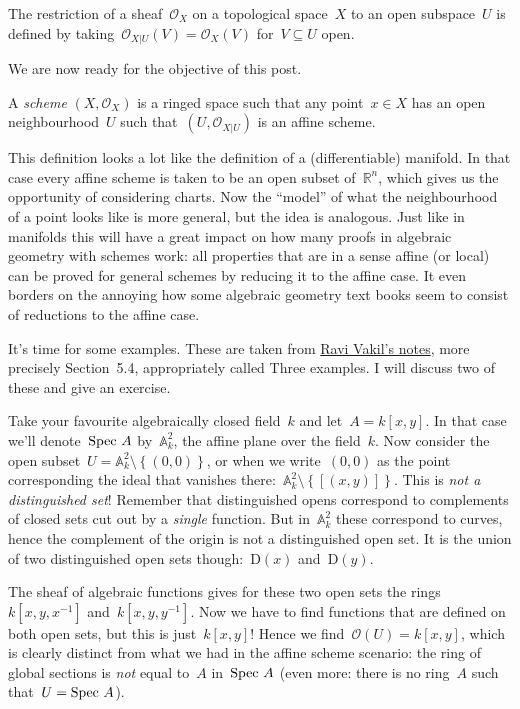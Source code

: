 \begin{definition}
  The restriction of a sheaf~$\mathcal{O}_X$ on a topological space~$X$ to an open subspace~$U$ is defined by taking~$\mathcal{O}_{X|U}(V)=\mathcal{O}_X(V)$ for~$V\subseteq U$ open.
\end{definition}

We are now ready for the objective of this post.

\begin{definition}
  A \emph{scheme} $(X,\mathcal{O}_X)$ is a ringed space such that any point~$x\in X$ has an open neighbourhood~$U$ such that~$(U,\mathcal{O}_{X|U})$ is an affine scheme.
\end{definition}

This definition looks a lot like the definition of a (differentiable) manifold. In that case every affine scheme is taken to be an open subset of~$\mathbb{R}^n$, which gives us the opportunity of considering charts. Now the ``model'' of what the neighbourhood of a point looks like is more general, but the idea is analogous. Just like in manifolds this will have a great impact on how many proofs in algebraic geometry with schemes work: all properties that are in a sense affine (or local) can be proved for general schemes by reducing it to the affine case. It even borders on the annoying how some algebraic geometry text books seem to consist of reductions to the affine case.

It's time for some examples. These are taken from \iftex\cite{foag}\fi\ifblog\href{http://math216.wordpress.com}{Ravi Vakil's notes}\fi, more precisely Section~5.4, appropriately called Three examples. I will discuss two of these and give an exercise.

\begin{example}
  Take your favourite algebraically closed field~$k$ and let~$A=k[x,y]$. In that case we'll denote~$\operatorname{Spec\,} A$ by~$\mathbb{A}^2_k$, the affine plane over the field~$k$. Now consider the open subset~$U=\mathbb{A}^2_k\setminus\left\{ (0,0) \right\}$, or when we write~$(0,0)$ as the point corresponding the ideal that vanishes there:~$\mathbb{A}^2_k\setminus\left\{ \left[ (x,y) \right] \right\}$. This is \emph{not a distinguished set}! Remember that distinguished opens correspond to complements of closed sets cut out by a \emph{single} function. But in~$\mathbb{A}^2_k$ these correspond to curves, hence the complement of the origin is not a distinguished open set. It is the union of two distinguished open sets though:~$\mathrm{D}(x)$ and~$\mathrm{D}(y)$.

  The sheaf of algebraic functions gives for these two open sets the rings~$k[x,y,x^{-1}]$ and~$k[x,y,y^{-1}]$. Now we have to find functions that are defined on both open sets, but this is just~$k[x,y]$! Hence we find~$\mathcal{O}(U)=k[x,y]$, which is clearly distinct from what we had in the affine scheme scenario: the ring of global sections is \emph{not} equal to~$A$ in~$\operatorname{Spec\,} A$ (even more: there is no ring~$A$ such that~$U=\operatorname{Spec\,} A$).
\end{example}

